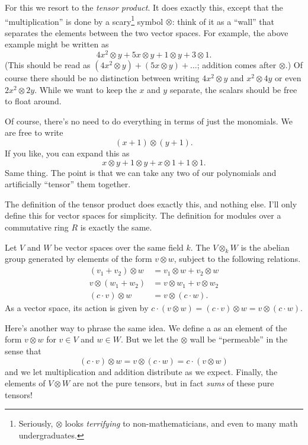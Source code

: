For this we resort to the \emph{tensor product}.
It does exactly this, except that the ``multiplication''
is done by a scary\footnote{%
	Seriously, $\otimes$ looks \emph{terrifying} to non-mathematicians,
	and even to many math undergraduates.}
symbol $\otimes$:
think of it as a ``wall'' that separates the elements
between the two vector spaces.
For example, the above example might be written as
\[ 4x^2 \otimes y + 5x \otimes y + 1 \otimes y + 3 \otimes 1. \]
(This should be read as $(4x^2 \otimes y) + (5x \otimes y) + \dots$; addition comes after $\otimes$.)
Of course there should be no distinction between writing $4x^2 \otimes y$ and $x^2 \otimes 4y$ or even $2x^2 \otimes 2y$.
While we want to keep the $x$ and $y$ separate, the scalars should be free to float around.

Of course, there's no need to do everything in terms of just the monomials.
We are free to write
\[ (x + 1) \otimes (y + 1). \]
If you like, you can expand this as
\[ x \otimes y + 1 \otimes y + x \otimes 1 + 1 \otimes 1. \]
Same thing.
The point is that we can take any two of our polynomials
and artificially ``tensor'' them together.

The definition of the tensor product does exactly this,
and nothing else.
I'll only define this for vector spaces for simplicity.
The definition for modules over a commutative ring $R$ is exactly the same.
\begin{definition}
	Let $V$ and $W$ be vector spaces over the same field $k$.
	The  $V \otimes_k W$ is the abelian group
	generated by elements of the form $v \otimes w$,
	subject to the following relations.
	\begin{align*}
		(v_1 + v_2) \otimes w &= v_1 \otimes w + v_2 \otimes w \\
		v \otimes (w_1 + w_2) &= v \otimes w_1 + v \otimes w_2 \\
		(c \cdot v) \otimes w &= v \otimes (c \cdot w).
	\end{align*}
	As a vector space,
	its action is given by
	$c \cdot (v \otimes w) = (c \cdot v) \otimes w = v \otimes (c \cdot w)$.
\end{definition}
Here's another way to phrase the same idea.
We define a  as an
element of the form $v \otimes w$ for $v \in V$ and $w \in W$.
But we let the $\otimes$ wall be ``permeable'' in the sense that
\[ (c \cdot v) \otimes w = v \otimes (c \cdot w) = c \cdot (v \otimes w) \]
and we let multiplication and addition distribute as we expect.
Finally, the elements of $V \otimes W$ are not the pure tensors,
but in fact \emph{sums} of these pure tensors!

